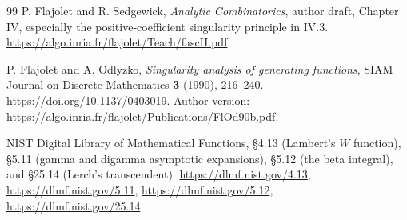 \begin{thebibliography}{99}
P. Flajolet and R. Sedgewick,
\emph{Analytic Combinatorics}, author draft, Chapter IV,
especially the positive-coefficient singularity principle in IV.3.
\url{https://algo.inria.fr/flajolet/Teach/fascII.pdf}.

P. Flajolet and A. Odlyzko, \emph{Singularity analysis of generating functions},
SIAM Journal on Discrete Mathematics \textbf{3} (1990), 216--240.
\url{https://doi.org/10.1137/0403019}.
Author version:
\url{https://algo.inria.fr/flajolet/Publications/FlOd90b.pdf}.

NIST Digital Library of Mathematical Functions,
\S4.13 (Lambert's $W$ function),
\S5.11 (gamma and digamma asymptotic expansions),
\S5.12 (the beta integral), and \S25.14 (Lerch's transcendent).
\url{https://dlmf.nist.gov/4.13},
\url{https://dlmf.nist.gov/5.11},
\url{https://dlmf.nist.gov/5.12},
\url{https://dlmf.nist.gov/25.14}.
\end{thebibliography}
